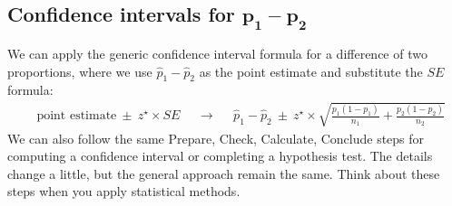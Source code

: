 

\subsection[Confidence intervals for $p_1 - p_2$]
    {Confidence intervals for $\mathbf{p_1 - p_2}$}


\noindent%
We can apply the generic confidence interval formula
for a difference of two proportions,
where we use $\hat{p}_1 - \hat{p}_2$ as the point
estimate and substitute the $SE$ formula:
\begin{align*}
&\text{point estimate} \ \pm\  z^{\star} \times SE
&&\to
&&\hat{p}_1 - \hat{p}_2 \ \pm\ 
    z^{\star} \times
   \sqrt{\frac{p_1(1-p_1)}{n_1} + \frac{p_2(1-p_2)}{n_2}}
\end{align*}
We can also follow the same
Prepare, Check, Calculate, Conclude steps for
computing a confidence interval
or completing a hypothesis test.
The details change a little,
but the general approach remain the same.
Think about these steps when you apply statistical methods.

